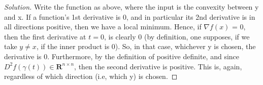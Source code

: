 \documentclass{article}
\newenvironment{solution}{\begin{proof}[Solution]}{\end{proof}}
\begin{document}
\begin{solution}
Write the function as above, where the input is the convexity between y and x. If a function's 1st derivative is 0, and in particular its 2nd derivative is in all directions positive, then we have a local minimum. Hence, if $\nabla f(x)$ = 0, then the first derivative at $ t = 0 $, is clearly 0 (by definition, one supposes, if we take $y \neq x$, if the inner product is 0). So, in that case, whichever y is chosen, the derivative is 0. Furthermore, by the definition of positive definite, and since $D^{2}f(\gamma (t)) \in \mathbf{R}^{n \times n}$, then the second derivative is positive. This is, again, regardless of which direction (i.e, which y) is chosen.
\end{solution}
\end{document}
